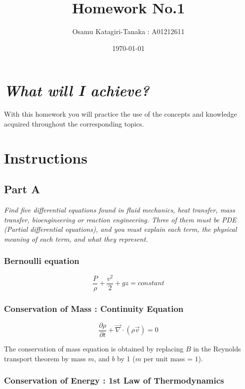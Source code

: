 \documentclass{article}
\title{Homework No.1}
\author{Osamu Katagiri-Tanaka : A01212611}
\date{\today}
\begin{document}
\maketitle

\section*{\emph{What will I achieve?}}
With this homework you will practice the use of the concepts and knowledge acquired throughout the corresponding topics.

\section*{Instructions}

\subsection*{Part A}
\textit{Find five differential equations found in fluid mechanics, heat transfer, mass transfer, bioengineering or reaction engineering. Three of them must be PDE (Partial differential equations), and you must explain each term, the physical meaning of each term, and what they represent.}

\subsubsection*{Bernoulli equation}

\begin{equation}
\frac{P}{\rho} + \frac{v^2}{2} + g z = constant
\end{equation}

\subsubsection*{Conservation of Mass : Continuity Equation}

\begin{equation}
\frac{\partial \rho}{\partial t} + \vec{\nabla} \cdot (\rho \vec{v}) = 0
\end{equation}

The conservation of mass equation
is obtained by replacing $B$ in the Reynolds transport theorem by mass $m$, and $b$ by 1 ($m$ per unit mass = $1$).
\cite{White2011}

\subsubsection*{Conservation of Energy : 1st Law of Thermodynamics}
\end{document}
